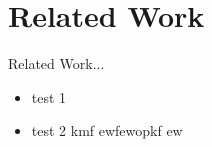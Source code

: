 \chapter{Related Work}
\label{Related Work}
Related Work...
\begin{itemize}
	\item test 1
	\item test 2 kmf ewfewopkf ew
\end{itemize}
